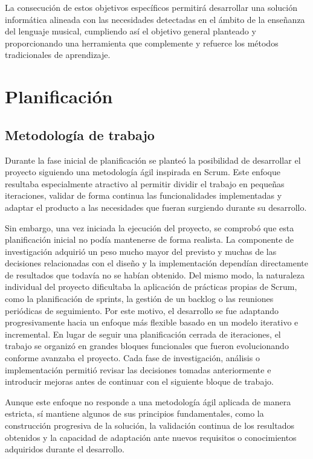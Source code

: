 La consecución de estos objetivos específicos permitirá desarrollar una solución informática alineada con las necesidades detectadas en el ámbito de la enseñanza del lenguaje musical, cumpliendo así el objetivo general planteado y proporcionando una herramienta que complemente y refuerce los métodos tradicionales de aprendizaje.

\section{Planificación}

\subsection{Metodología de trabajo}

Durante la fase inicial de planificación se planteó la posibilidad de desarrollar el proyecto siguiendo una metodología ágil inspirada en Scrum. Este enfoque resultaba especialmente atractivo al permitir dividir el trabajo en pequeñas iteraciones, validar de forma continua las funcionalidades implementadas y adaptar el producto a las necesidades que fueran surgiendo durante su desarrollo.

Sin embargo, una vez iniciada la ejecución del proyecto, se comprobó que esta planificación inicial no podía mantenerse de forma realista. La componente de investigación adquirió un peso mucho mayor del previsto y muchas de las decisiones relacionadas con el diseño y la implementación dependían directamente de resultados que todavía no se habían obtenido. Del mismo modo, la naturaleza individual del proyecto dificultaba la aplicación de prácticas propias de Scrum, como la planificación de sprints, la gestión de un backlog o las reuniones periódicas de seguimiento.
\newpage
Por este motivo, el desarrollo se fue adaptando progresivamente hacia un enfoque más flexible basado en un modelo iterativo e incremental. En lugar de seguir una planificación cerrada de iteraciones, el trabajo se organizó en grandes bloques funcionales que fueron evolucionando conforme avanzaba el proyecto. Cada fase de investigación, análisis o implementación permitió revisar las decisiones tomadas anteriormente e introducir mejoras antes de continuar con el siguiente bloque de trabajo.

Aunque este enfoque no responde a una metodología ágil aplicada de manera estricta, sí mantiene algunos de sus principios fundamentales, como la construcción progresiva de la solución, la validación continua de los resultados obtenidos y la capacidad de adaptación ante nuevos requisitos o conocimientos adquiridos durante el desarrollo.


